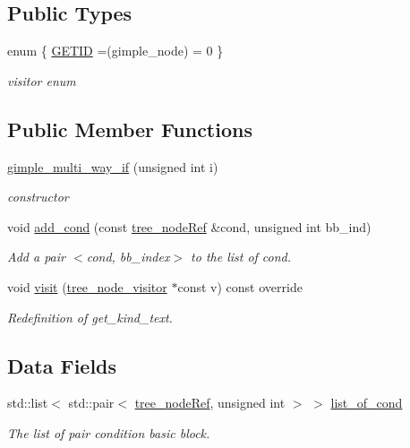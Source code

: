 \subsection*{Public Types}
\begin{DoxyCompactItemize}
\item 
enum \{ \hyperlink{structgimple__multi__way__if_a53ea1bd8d2f872fd1b78cddd08db9b26a2c1dac7cb088ca3c77e571964fdc3ea9}{G\+E\+T\+ID} =(gimple\+\_\+node) = 0
 \}\begin{DoxyCompactList}\small\item\em visitor enum \end{DoxyCompactList}
\end{DoxyCompactItemize}
\subsection*{Public Member Functions}
\begin{DoxyCompactItemize}
\item 
\hyperlink{structgimple__multi__way__if_a4bc28b63923822ab5debc65ae1f4b12e}{gimple\+\_\+multi\+\_\+way\+\_\+if} (unsigned int i)
\begin{DoxyCompactList}\small\item\em constructor \end{DoxyCompactList}\item 
void \hyperlink{structgimple__multi__way__if_a2b5095bc80f5012407d02f505332329a}{add\+\_\+cond} (const \hyperlink{tree__node_8hpp_a6ee377554d1c4871ad66a337eaa67fd5}{tree\+\_\+node\+Ref} \&cond, unsigned int bb\+\_\+ind)
\begin{DoxyCompactList}\small\item\em Add a pair $<$cond, bb\+\_\+index$>$ to the list of cond. \end{DoxyCompactList}\item 
void \hyperlink{structgimple__multi__way__if_a5f89fbe2e85d7d49eb8684204e309712}{visit} (\hyperlink{classtree__node__visitor}{tree\+\_\+node\+\_\+visitor} $\ast$const v) const override
\begin{DoxyCompactList}\small\item\em Redefinition of get\+\_\+kind\+\_\+text. \end{DoxyCompactList}\end{DoxyCompactItemize}
\subsection*{Data Fields}
\begin{DoxyCompactItemize}
\item 
std\+::list$<$ std\+::pair$<$ \hyperlink{tree__node_8hpp_a6ee377554d1c4871ad66a337eaa67fd5}{tree\+\_\+node\+Ref}, unsigned int $>$ $>$ \hyperlink{structgimple__multi__way__if_a453a071b56fd6f7f47c449e7f87a725e}{list\+\_\+of\+\_\+cond}
\begin{DoxyCompactList}\small\item\em The list of pair condition basic block. \end{DoxyCompactList}\end{DoxyCompactItemize}
